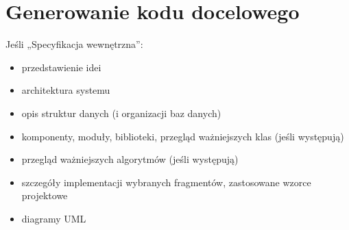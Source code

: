 \section{Generowanie kodu docelowego}

Jeśli „Specyfikacja wewnętrzna”:
\begin{itemize}
\item przedstawienie idei
\item architektura systemu
\item opis struktur danych (i organizacji baz danych)
\item komponenty, moduły, biblioteki, przegląd ważniejszych klas (jeśli występują)
\item przegląd ważniejszych algorytmów (jeśli występują)
\item szczegóły implementacji wybranych fragmentów, zastosowane wzorce projektowe
\item diagramy UML
\end{itemize}



%
%
%      
%
%
%
